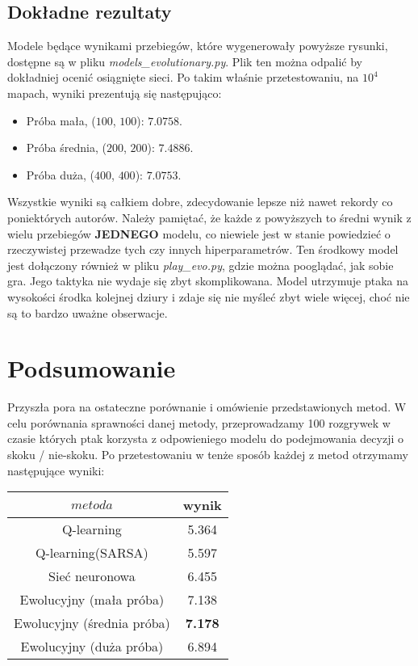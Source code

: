 \documentclass[12pt, A4]{article}
\begin{document}
\subsection{Dokładne rezultaty}
Modele będące wynikami przebiegów, które wygenerowały powyższe rysunki, dostępne są w pliku \textit{models\_evolutionary.py}. Plik ten można odpalić by dokładniej ocenić osiągnięte sieci. Po takim właśnie przetestowaniu, na $10^4$ mapach, wyniki prezentują się następująco:
\begin{itemize}
	\item Próba mała, ($100$, $100$): $7.0758$.
	\item Próba średnia, ($200$, $200$): $7.4886$.
	\item Próba duża, ($400$, $400$): $7.0753$.
\end{itemize}
Wszystkie wyniki są całkiem dobre, zdecydowanie lepsze niż nawet rekordy co poniektórych autorów. Należy pamiętać, że każde z powyższych to średni wynik z wielu przebiegów \textbf{JEDNEGO} modelu, co niewiele jest w stanie powiedzieć o rzeczywistej przewadze tych czy innych hiperparametrów.
\newline\newline
Ten środkowy model jest dołączony również w pliku \textit{play\_evo.py}, gdzie można pooglądać, jak sobie gra.
\newline
Jego taktyka nie wydaje się zbyt skomplikowana. Model utrzymuje ptaka na wysokości środka kolejnej dziury i zdaje się nie myśleć zbyt wiele więcej, choć nie są to bardzo uważne obserwacje.


\section{Podsumowanie}
Przyszła pora na ostateczne porównanie i omówienie przedstawionych metod. W celu porównania sprawności danej metody, przeprowadzamy 100 rozgrywek w czasie których ptak korzysta z odpowieniego modelu do podejmowania decyzji o skoku / nie-skoku. Po przetestowaniu w tenże sposób każdej z metod otrzymamy następujące wyniki:
	
	\begin{center}	
	\begin{tabular}{||c c||}
	\hline
	 $metoda$ & wynik \\ [0.5ex]
	\hline\hline
	 Q-learning & 5.364 \\
	 Q-learning(SARSA) & 5.597 \\
	 Sieć neuronowa & 6.455 \\
	 Ewolucyjny (mała próba) & 7.138 \\
	 Ewolucyjny (średnia próba) & \textbf{7.178} \\
	 Ewolucyjny (duża próba) & 6.894 \\ [1ex]
	 \hline
	\end{tabular}
	\end{center}
\end{document}
